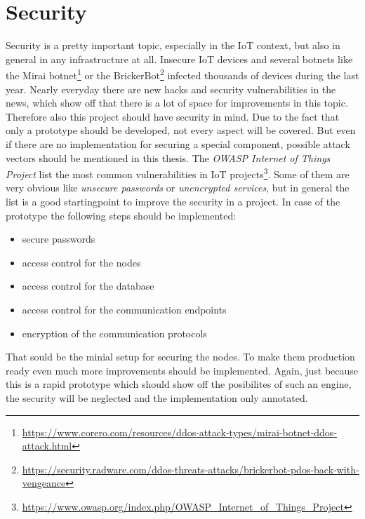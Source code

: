 \section{Security}
Security is a pretty important topic, especially in the \ac{IoT} context, but also in general in any infrastructure at all.
Insecure \ac{IoT} devices and several botnets like the Mirai botnet\footnote{\url{https://www.corero.com/resources/ddos-attack-types/mirai-botnet-ddos-attack.html}} or the BrickerBot\footnote{\url{https://security.radware.com/ddos-threats-attacks/brickerbot-pdos-back-with-vengeance}} infected thousands of devices during the last year.
Nearly everyday there are new hacks and security vulnerabilities in the news, which show off that there is a lot of space for improvements in this topic.
Therefore also this project should have security in mind.
Due to the fact that only a prototype should be developed, not every aspect will be covered.
But even if there are no implementation for securing a special component, possible attack vectors should be mentioned in this thesis.
The \textit{OWASP Internet of Things Project} list the most common vulnerabilities in \ac{IoT} projects\footnote{\url{https://www.owasp.org/index.php/OWASP_Internet_of_Things_Project}}.
Some of them are very obvious like \textit{unsecure passwords} or \textit{unencrypted services}, but in general the list is a good startingpoint to improve the security in a project.
In case of the prototype the following steps should be implemented:
\begin{itemize}
  \item secure passwords
  \item access control for the nodes
  \item access control for the database
  \item access control for the communication endpoints
  \item encryption of the communication protocols
\end{itemize}

That sould be the minial setup for securing the nodes.
To make them production ready even much more improvements should be implemented.
Again, just because this is a rapid prototype which should show off the posibilites of such an engine, the security will be neglected and the implementation only annotated.


